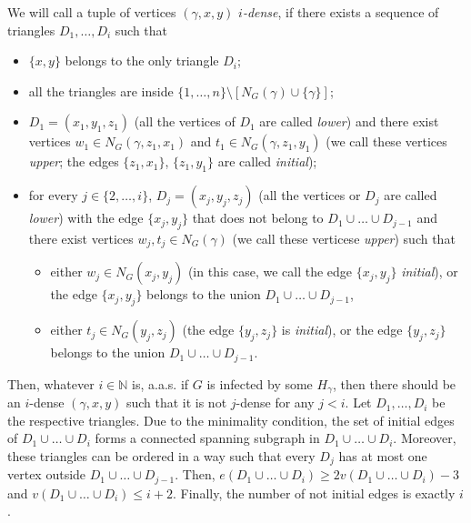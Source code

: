 \documentclass[]{article}
\begin{document}
We will call a tuple of vertices $(\gamma,x,y)$ {\it $i$-dense}, if there exists a sequence of triangles $D_1,\ldots,D_i$
such that  
\begin{itemize}
\item $\{x,y\}$ belongs to the only triangle $D_i$;
\item all the triangles are inside $\{1,\ldots,n\}\setminus[N_G(\gamma)\cup\{\gamma\}]$;
\item $D_1=(x_1,y_1,z_1)$ (all the vertices of $D_1$ are called {\it lower}) and there exist vertices $w_1\in N_G(\gamma,z_1,x_1)$ and $t_1\in N_G(\gamma,z_1,y_1)$ (we call these vertices {\it upper}; the edges $\{z_1,x_1\}$, $\{z_1,y_1\}$ are called {\it initial});
\item for every $j\in\{2,\ldots,i\}$,  $D_j=(x_j,y_j,z_j)$ (all the vertices or $D_j$ are called {\it lower}) with the edge $\{x_j,y_j\}$ that does not belong to $D_1\cup\ldots\cup D_{j-1}$ and there exist vertices $w_j,t_j\in N_G(\gamma)$ (we call these verticese {\it upper}) such that
\begin{itemize}
\item either $w_j\in N_G(x_j,y_j)$ (in this case, we call the edge $\{x_j,y_j\}$ {\it initial}), or the edge $\{x_j,y_j\}$ belongs to the union $D_1\cup\ldots\cup D_{j-1}$,
\item either $t_j\in N_G(y_j,z_j)$ (the edge $\{y_j,z_j\}$ is {\it initial}), or the edge $\{y_j,z_j\}$ belongs to the union $D_1\cup\ldots\cup D_{j-1}$.
\end{itemize} 
\end{itemize}
Then, whatever $i\in\mathbb{N}$ is, a.a.s. if $G$ is infected by some $H_{\gamma}$, then there should be an $i$-dense $(\gamma,x,y)$ such that it is not $j$-dense for any $j<i$. Let $D_1,\ldots,D_i$ be the respective triangles. Due to the minimality condition, the set of initial edges of $D_1\cup\ldots\cup D_i$ forms a connected spanning subgraph in $D_1\cup\ldots\cup D_i$. Moreover, these triangles can be ordered in a way such that every $D_j$ has at most one vertex outside $D_1\cup\ldots\cup D_{j-1}$. Then, $e(D_1\cup\ldots\cup D_i)\geq 2v(D_1\cup\ldots\cup D_i)-3$ and $v(D_1\cup\ldots\cup D_i)\leq i+2$. Finally, the number of not initial edges is exactly $i$. 
\end{document}
